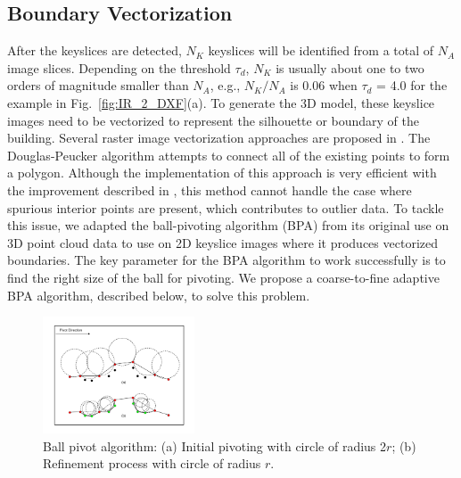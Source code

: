 \documentclass{acmsiggraph}                     %
\newcommand{\Figa}[1]{Fig.~\ref{fig:#1}(a)}
\begin{document}
\subsection{Boundary Vectorization}
\label{sec:BPA}
After the keyslices are detected, $N_K$ keyslices will be identified
from a total of $N_A$ image slices.
Depending on the threshold $\tau_{d}$, $N_K$ is usually about one to two
orders of magnitude smaller than $N_A$, e.g., $N_K/N_A$ is 0.06 when
$\tau_d$ = 4.0 for the example in \Figa{IR_2_DXF}.
To generate the 3D model, these keyslice images need to be vectorized to
represent the silhouette or boundary of the building.
Several raster image vectorization approaches are proposed in
\cite{DP_AAKMT,DP_DP}.
The Douglas-Peucker algorithm attempts to connect all of the existing points
to form a polygon.
Although the implementation of this approach is very efficient with the
improvement described in \cite{DP_HS}, this method cannot handle the case
where spurious interior points are present, which contributes to outlier data.
To tackle this issue, we adapted the ball-pivoting algorithm (BPA)
\cite{BPA_BMRS} from its original use on 3D point cloud data to use on
2D keyslice images where it produces vectorized boundaries.
The key parameter for the BPA algorithm to work successfully is to
find the right size of the ball for pivoting.
We propose a coarse-to-fine adaptive BPA algorithm, described below,
to solve this problem.

\begin{figure}[hbtp]
\centering
\includegraphics[width=0.4\textwidth]{figures/BPA.pdf}
\caption{Ball pivot algorithm: (a) Initial pivoting with circle of radius 2$r$;
(b) Refinement process with circle of radius $r$.}
\label{fig:BPA}
\end{figure}
\end{document}
